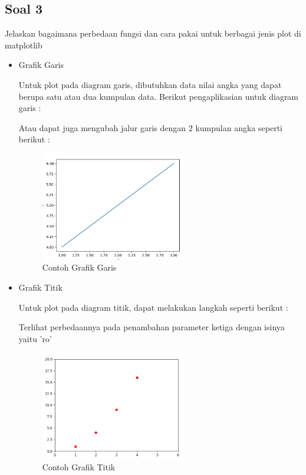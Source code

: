 \subsection{Soal 3}
Jelaskan bagaimana perbedaan fungsi dan cara pakai untuk berbagai jenis plot di matplotlib
\begin{itemize}
	\item Grafik Garis
	
	Untuk plot pada diagram garis, dibutuhkan data nilai angka yang dapat berupa satu atau dua kumpulan data. Berikut pengaplikasian untuk diagram garis : 
	
	Atau dapat juga mengubah jalur garis dengan 2 kumpulan angka seperti berikut : 
	
	\begin{figure} [ht]
		\centerline{\includegraphics[width=0.6\textwidth]{figures/6/1174035/Teori/Soal3Garis.png}}
		\caption{Contoh Grafik Garis}
		\label{Contoh_Soal3Garis}
	\end{figure}
	
	\item Grafik Titik
	
	Untuk plot pada diagram titik, dapat melakukan langkah seperti berikut : 
	
	Terlihat perbedaannya pada penambahan parameter ketiga dengan isinya yaitu 'ro'
	\begin{figure} [ht]
		\centerline{\includegraphics[width=0.6\textwidth]{figures/6/1174035/Teori/Soal3Titik.png}}
		\caption{Contoh Grafik Titik}
		\label{Contoh_Soal3Titik}
	\end{figure}
	

\end{itemize}
